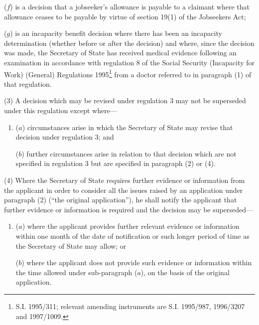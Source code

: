 \documentclass[12pt,a4paper]{article}
\begin{document}
\begin{enumerate}

($f$) is a decision that a jobseeker’s allowance is payable to a claimant where that allowance ceases to be payable by virtue of section 19(1) of the Jobseekers Act;

($g$) is an incapacity benefit decision where there has been an incapacity determination (whether before or after the decision) and where, since the decision was made, the Secretary of State has received medical evidence following an examination in accordance with regulation 8 of the Social Security (Incapacity for Work) (General) Regulations 1995\footnote{\frenchspacing S.I. 1995/311; relevant amending instruments are S.I. 1995/987, 1996/3207 and 1997/1009.} from a doctor referred to in paragraph (1) of that regulation.
\end{enumerate}

(3) A decision which may be revised under regulation 3 may not be superseded under this regulation except where—
\begin{enumerate}\item[]
($a$) circumstances arise in which the Secretary of State may revise that decision under regulation 3; and

($b$) further circumstances arise in relation to that decision which are not specified in regulation 3 but are specified in paragraph (2) or (4).
\end{enumerate}

(4) Where the Secretary of State requires further evidence or information from the applicant in order to consider all the issues raised by an application under paragraph (2) (“the original application”), he shall notify the applicant that further evidence or information is required and the decision may be superseded—
\begin{enumerate}\item[]
($a$) where the applicant provides further relevant evidence or information within one month of the date of notification or such longer period of time as the Secretary of State may allow; or

($b$) where the applicant does not provide such evidence or information within the time allowed under sub-paragraph ($a$), on the basis of the original application.
\end{enumerate}
\end{document}
